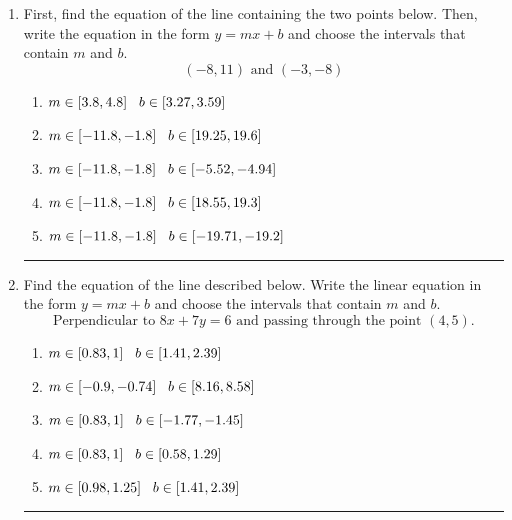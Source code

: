 \documentclass[14pt]{extbook}
\newcommand{\litem}[1]{\item#1\hspace*{-1cm}\rule{\textwidth}{0.4pt}}
\begin{document}
\begin{enumerate}
{\begin{enumerate}[label=\Alph*.]
\end{enumerate} }
\litem{
First, find the equation of the line containing the two points below. Then, write the equation in the form $ y=mx+b $ and choose the intervals that contain $m$ and $b$.\[ (-8, 11) \text{ and } (-3, -8) \]\begin{enumerate}[label=\Alph*.]
\item \( m \in [3.8, 4.8] \hspace*{3mm} b \in [3.27, 3.59] \)
\item \( m \in [-11.8, -1.8] \hspace*{3mm} b \in [19.25, 19.6] \)
\item \( m \in [-11.8, -1.8] \hspace*{3mm} b \in [-5.52, -4.94] \)
\item \( m \in [-11.8, -1.8] \hspace*{3mm} b \in [18.55, 19.3] \)
\item \( m \in [-11.8, -1.8] \hspace*{3mm} b \in [-19.71, -19.2] \)

\end{enumerate} }
\litem{
Find the equation of the line described below. Write the linear equation in the form $ y=mx+b $ and choose the intervals that contain $m$ and $b$.\[ \text{Perpendicular to } 8 x + 7 y = 6 \text{ and passing through the point } (4, 5). \]\begin{enumerate}[label=\Alph*.]
\item \( m \in [0.83, 1] \hspace*{3mm} b \in [1.41, 2.39] \)
\item \( m \in [-0.9, -0.74] \hspace*{3mm} b \in [8.16, 8.58] \)
\item \( m \in [0.83, 1] \hspace*{3mm} b \in [-1.77, -1.45] \)
\item \( m \in [0.83, 1] \hspace*{3mm} b \in [0.58, 1.29] \)
\item \( m \in [0.98, 1.25] \hspace*{3mm} b \in [1.41, 2.39] \)


\end{enumerate}}
\end{enumerate}
\end{document}
